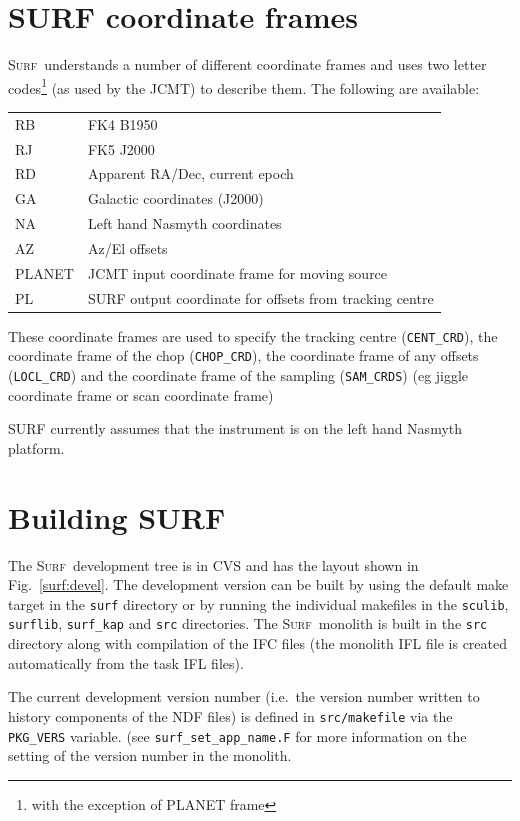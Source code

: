 \documentclass[twoside,11pt,nolof]{starlink}
\providecommand{\scusoft}          {\textsc{Surf}}
\begin{document}
\section{SURF coordinate frames\label{app:frames}}

\scusoft\ understands a number of different coordinate frames and uses
two letter codes\footnote{with the exception of PLANET frame}
(as used by the JCMT) to describe them. The following
are available:

\begin{tabular}{ll}
RB & FK4 B1950\\
RJ & FK5 J2000\\
RD & Apparent RA/Dec, current epoch\\
GA & Galactic coordinates (J2000) \\
NA & Left hand Nasmyth coordinates \\
AZ & Az/El offsets \\
PLANET & JCMT input coordinate frame for moving source \\
PL & SURF output coordinate for offsets from tracking centre\\
\end{tabular}

These coordinate frames are used to specify the tracking centre
(\texttt{CENT\_CRD}), the coordinate frame of the chop (\texttt{CHOP\_CRD}),
the coordinate frame of any offsets (\texttt{LOCL\_CRD}) and the coordinate
frame of the sampling (\texttt{SAM\_CRDS}) (eg jiggle coordinate frame or scan
coordinate frame)

SURF currently assumes that the instrument is on the left hand Nasmyth
platform.

\section{Building SURF}

The \scusoft\ development tree is in CVS and has the layout shown in
Fig.\ \ref{surf:devel}. The development version can be built
by using the default make target in the \texttt{surf} directory or
by running the individual makefiles in the \texttt{sculib}, \texttt{surflib},
\texttt{surf\_kap} and \texttt{src} directories. The \scusoft\ monolith is
built in the \texttt{src} directory along with compilation of the IFC files
(the monolith IFL file is created automatically from the task IFL files).

The current development version number (i.e.\ the version number written to
history components of the NDF files) is defined in \texttt{src/makefile}
via the \texttt{PKG\_VERS} variable. (see \texttt{surf\_set\_app\_name.F} for
more information on the setting of the version number in the monolith.
\end{document}

